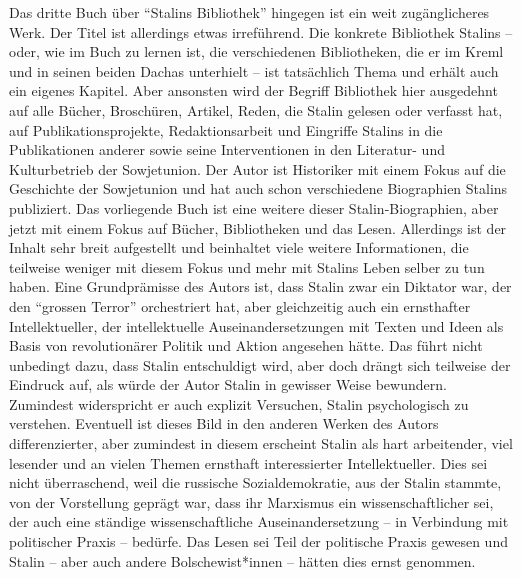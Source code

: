 \documentclass[a4paper,
fontsize=11pt,
oneside,
numbers=noperiodatend,
parskip=half-,
bibliography=totoc,
final
]{scrartcl}
\begin{document}
Das dritte Buch über \enquote{Stalins Bibliothek} hingegen ist ein weit
zugänglicheres Werk. Der Titel ist allerdings etwas irreführend. Die
konkrete Bibliothek Stalins -- oder, wie im Buch zu lernen ist, die
verschiedenen Bibliotheken, die er im Kreml und in seinen beiden Dachas
unterhielt -- ist tatsächlich Thema und erhält auch ein eigenes Kapitel.
Aber ansonsten wird der Begriff Bibliothek hier ausgedehnt auf alle
Bücher, Broschüren, Artikel, Reden, die Stalin gelesen oder verfasst
hat, auf Publikationsprojekte, Redaktionsarbeit und Eingriffe Stalins in
die Publikationen anderer sowie seine Interventionen in den Literatur-
und Kulturbetrieb der Sowjetunion. Der Autor ist Historiker mit einem
Fokus auf die Geschichte der Sowjetunion und hat auch schon verschiedene
Biographien Stalins publiziert. Das vorliegende Buch ist eine weitere
dieser Stalin-Biographien, aber jetzt mit einem Fokus auf Bücher,
Bibliotheken und das Lesen. Allerdings ist der Inhalt sehr breit
aufgestellt und beinhaltet viele weitere Informationen, die teilweise
weniger mit diesem Fokus und mehr mit Stalins Leben selber zu tun haben.
Eine Grundprämisse des Autors ist, dass Stalin zwar ein Diktator war,
der den \enquote{grossen Terror} orchestriert hat, aber gleichzeitig
auch ein ernsthafter Intellektueller, der intellektuelle
Auseinandersetzungen mit Texten und Ideen als Basis von revolutionärer
Politik und Aktion angesehen hätte. Das führt nicht unbedingt dazu, dass
Stalin entschuldigt wird, aber doch drängt sich teilweise der Eindruck
auf, als würde der Autor Stalin in gewisser Weise bewundern. Zumindest
widerspricht er auch explizit Versuchen, Stalin psychologisch zu
verstehen. Eventuell ist dieses Bild in den anderen Werken des Autors
differenzierter, aber zumindest in diesem erscheint Stalin als hart
arbeitender, viel lesender und an vielen Themen ernsthaft interessierter
Intellektueller. Dies sei nicht überraschend, weil die russische
Sozialdemokratie, aus der Stalin stammte, von der Vorstellung geprägt
war, dass ihr Marxismus ein wissenschaftlicher sei, der auch eine
ständige wissenschaftliche Auseinandersetzung -- in Verbindung mit
politischer Praxis -- bedürfe. Das Lesen sei Teil der politische Praxis
gewesen und Stalin -- aber auch andere Bolschewist*innen -- hätten dies
ernst genommen.
\end{document}
